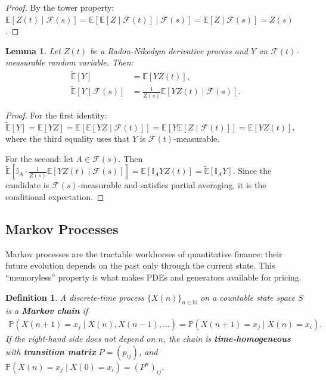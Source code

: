 \documentclass{report}
\theoremstyle{spacedplain}
\newtheorem{lemma}[theorem]{Lemma}
\theoremstyle{spaceddefinition}
\newtheorem{definition}[theorem]{Definition}
\theoremstyle{spacedremark}
\begin{document}
\begin{proof}
By the tower property: $\mathbb{E}[Z(t) \mid \mathcal{F}(s)] = \mathbb{E}[\mathbb{E}[Z \mid \mathcal{F}(t)] \mid \mathcal{F}(s)] = \mathbb{E}[Z \mid \mathcal{F}(s)] = Z(s)$.
\end{proof}

\begin{lemma}
Let $Z(t)$ be a Radon-Nikodym derivative process and $Y$ an $\mathcal{F}(t)$-measurable random variable. Then:
\begin{align}
    \widetilde{\mathbb{E}}[Y] &= \mathbb{E}[Y Z(t)], \\
    \widetilde{\mathbb{E}}[Y \mid \mathcal{F}(s)] &= \frac{1}{Z(s)}\mathbb{E}[Y Z(t) \mid \mathcal{F}(s)].
\end{align}
\end{lemma}

\begin{proof}
For the first identity: $\widetilde{\mathbb{E}}[Y] = \mathbb{E}[YZ] = \mathbb{E}[\mathbb{E}[YZ \mid \mathcal{F}(t)]] = \mathbb{E}[Y \mathbb{E}[Z \mid \mathcal{F}(t)]] = \mathbb{E}[YZ(t)]$, where the third equality uses that $Y$ is $\mathcal{F}(t)$-measurable.

For the second: let $A \in \mathcal{F}(s)$. Then $\widetilde{\mathbb{E}}[\mathbb{I}_A \cdot \frac{1}{Z(s)}\mathbb{E}[YZ(t) \mid \mathcal{F}(s)]] = \mathbb{E}[\mathbb{I}_A Y Z(t)] = \widetilde{\mathbb{E}}[\mathbb{I}_A Y]$. Since the candidate is $\mathcal{F}(s)$-measurable and satisfies partial averaging, it is the conditional expectation.
\end{proof}

\subsection{Markov Processes}

Markov processes are the tractable workhorses of quantitative finance: their future evolution depends on the past only through the current state. This ``memoryless'' property is what makes PDEs and generators available for pricing.

\begin{definition}
A discrete-time process $\{X(n)\}_{n \in \mathbb{N}}$ on a countable state space $S$ is a \textbf{Markov chain} if
\begin{align}
    \mathbb{P}(X(n+1) = x_j \mid X(n), X(n-1), \ldots) = \mathbb{P}(X(n+1) = x_j \mid X(n) = x_i).
\end{align}
If the right-hand side does not depend on $n$, the chain is \textbf{time-homogeneous} with \textbf{transition matrix} $P = (p_{ij})$, and $\mathbb{P}(X(n) = x_j \mid X(0) = x_i) = (P^n)_{ij}$.
\end{definition}
\end{document}

